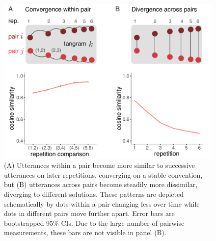 \documentclass[alpha-refs]{wiley-article}
\begin{document}
\begin{figure}[t]
\centering
\includegraphics[scale=.5]{similarity_analysis.pdf}
\vspace{1em}
\caption{(A) Utterances within a pair become more similar to successive utterances on later repetitions, converging on a stable convention, but (B) utterances across pairs become steadily more dissimilar, diverging to different solutions. These patterns are depicted schematically by dots within a pair changing less over time while dots in different pairs move further apart. Error bars are bootstrapped 95\% CIs. Due to the large number of pairwise measurements, these bars are not visible in panel (B).}
\label{fig:similarity}
\end{figure}
\end{document}
